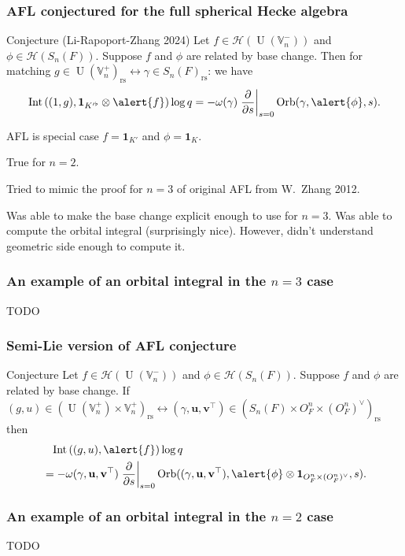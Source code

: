 \documentclass[11pt]{beamer}
\DeclareMathOperator{\Int}{Int}
\DeclareMathOperator{\Orb}{Orb}
\DeclareMathOperator{\U}{U}
\newcommand{\HH}{\mathcal{H}}
\newcommand{\VV}{\mathbb{V}}
\renewcommand{\OO}{O}
\newcommand{\guv}{{(\gamma, \uu, \vv^\top)}}
\newcommand{\rs}{_{\text{rs}}}
\newcommand{\uu}{\mathbf{u}}
\newcommand{\vv}{\mathbf{v}}
\newcommand{\oneV}{\mathbf{1}_{\OO_F^n \times (\OO_F^n)^\vee}}
\begin{document}
\begin{frame}
  \frametitle{AFL conjectured for the full spherical Hecke algebra}
  \begin{exampleblock}{Conjecture (Li-Rapoport-Zhang 2024)}
    Let \alert{$f \in \HH(\U(\VV_n^-))$} and \alert{$\phi \in \HH(S_n(F))$}.
    Suppose \alert{$f$ and $\phi$ are related by base change}.
    Then for matching $g \in \U(\VV_n^+)\rs \longleftrightarrow \gamma \in S_n(F)\rs$:
    we have
    \[ \Int\left( (1,g), \mathbf{1}_{K'^\flat} \otimes \alert{f} \right) \log q
    = -\omega(\gamma) \left. \pdv{}{s} \right\rvert_{s=0} \Orb(\gamma, \alert{\phi}, s). \]
  \end{exampleblock}
  AFL is special case $f = \mathbf{1}_{K'}$ and $\phi = \mathbf{1}_K$.
  \begin{theorem}
    True for $n = 2$.
  \end{theorem}
  Tried to mimic the proof for $n = 3$ of original AFL from W.\ Zhang 2012.
  \begin{itemize}
  \ii Was able to make the base change explicit enough to use for $n = 3$.
  \ii Was able to compute the orbital integral (surprisingly nice).
  \ii However, didn't understand geometric side enough to compute it.
  \end{itemize}
\end{frame}

\begin{frame}
  \frametitle{An example of an orbital integral in the $n=3$ case}
  TODO
\end{frame}

\begin{frame}
  \frametitle{Semi-Lie version of AFL conjecture}
  \begin{exampleblock}{Conjecture}
    Let \alert{$f \in \HH(\U(\VV_n^-))$} and \alert{$\phi \in \HH(S_n(F))$}.
    Suppose \alert{$f$ and $\phi$ are related by base change}.
    If $(g, u) \in (\U(\VV_n^+) \times \VV_n^+)\rs \longleftrightarrow
      (\gamma, \uu, \vv^\top) \in (S_n(F) \times \OO_F^n \times (\OO_F^n)^\vee)\rs$
    then
    \begin{align*}
      &\phantom= \Int\left( (g,u), \alert{f} \right) \log q \\
      &= -\omega\guv \left. \pdv{}{s} \right\rvert_{s=0}
      \Orb(\guv, \alert{\phi} \otimes \oneV, s).
    \end{align*}
  \end{exampleblock}
\end{frame}

\begin{frame}
  \frametitle{An example of an orbital integral in the $n=2$ case}
  TODO
\end{frame}
\end{document}
